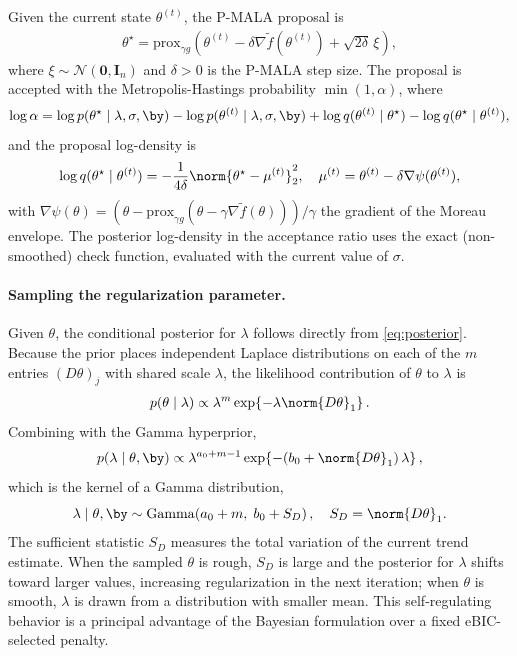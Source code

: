 Given the current state $\theta^{(t)}$, the P-MALA proposal is
\begin{align*}
    \theta^\star
    = \mathrm{prox}_{\gamma g}\!\left(
    \theta^{(t)} - \delta \nabla \tilde{f}(\theta^{(t)})
    + \sqrt{2\delta}\,\xi
    \right),
\end{align*}
where $\xi \sim \mathcal{N}(\mathbf{0}, \mathbf{I}_n)$ and $\delta > 0$ is the P-MALA step size. The proposal is accepted with the Metropolis-Hastings probability $\min(1, \alpha)$, where
\begin{align*}
    \log \alpha = \log p(\theta^\star \mid \lambda, \sigma, \by)
    - \log p(\theta^{(t)} \mid \lambda, \sigma, \by)
    + \log q(\theta^{(t)} \mid \theta^\star)
    - \log q(\theta^\star \mid \theta^{(t)}),
\end{align*}
and the proposal log-density is
\begin{align*}
    \log q(\theta^\star \mid \theta^{(t)})
    = -\frac{1}{4\delta}
    \norm{\theta^\star - \mu^{(t)}}_2^2, \quad
    \mu^{(t)} = \theta^{(t)}
    - \delta \nabla \psi(\theta^{(t)}),
\end{align*}
with $\nabla \psi(\theta) = (\theta - \mathrm{prox}_{\gamma g}(\theta - \gamma \nabla \tilde{f}(\theta)))/\gamma$ the gradient of the Moreau envelope. The posterior log-density in the acceptance ratio uses the exact (non-smoothed) check function, evaluated with the current value of $\sigma$.

\paragraph{Sampling the regularization parameter.}
Given $\theta$, the conditional posterior for $\lambda$ follows directly from \eqref{eq:posterior}. Because the prior places independent Laplace distributions on each of the $m$ entries $(D\theta)_j$ with shared scale $\lambda$, the likelihood contribution of $\theta$ to $\lambda$ is
\begin{align*}
    p(\theta \mid \lambda) \propto \lambda^{m}
    \exp\!\left\{-\lambda \norm{D\theta}_1\right\}.
\end{align*}
Combining with the Gamma hyperprior,
\begin{align*}
    p(\lambda \mid \theta, \by) \propto
    \lambda^{a_0 + m - 1}
    \exp\!\left\{-(b_0 + \norm{D\theta}_1)\,\lambda\right\},
\end{align*}
which is the kernel of a Gamma distribution,
\begin{equation}
    \lambda \mid \theta, \by \sim
    \mathrm{Gamma}\!\left(a_0 + m,\; b_0 + S_D\right),
    \quad S_D = \norm{D\theta}_1.
    \label{eq:lambdaupdate}
\end{equation}
The sufficient statistic $S_D$ measures the total variation of the current trend estimate. When the sampled $\theta$ is rough, $S_D$ is large and the posterior for $\lambda$ shifts toward larger values, increasing regularization in the next iteration; when $\theta$ is smooth, $\lambda$ is drawn from a distribution with smaller mean. This self-regulating behavior is a principal advantage of the Bayesian formulation over a fixed eBIC-selected penalty.

